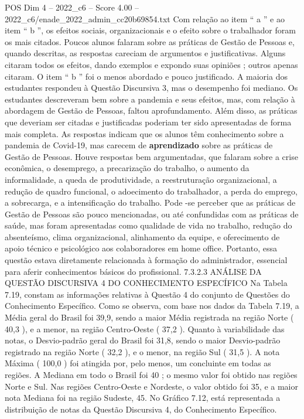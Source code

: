 \begin{textsample}{POS Dim 4 – 2022\_c6 – Score 4.00 – 2022\_c6/enade\_2022\_admin\_cc20b69854.txt}
Com relação ao item “ a ” e ao item “ b ”, os efeitos sociais, organizacionais e o efeito sobre o trabalhador foram os mais citados.
Poucos alunos falaram sobre as práticas de Gestão de Pessoas e, quando descritas, as respostas careciam de argumentos e justificativas.
Alguns citaram todos os efeitos, dando exemplos e expondo suas opiniões ; outros apenas citaram.
O item “ b ” foi o menos abordado e pouco justificado.
A maioria dos estudantes respondeu à Questão Discursiva 3, mas o desempenho foi mediano.
Os estudantes descreveram bem sobre a pandemia e seus efeitos, mas, com relação à abordagem de Gestão de Pessoas, faltou aprofundamento.
Além disso, as práticas que deveriam ser citadas e justificadas poderiam ter sido apresentadas de forma mais completa.
As respostas indicam que os alunos têm conhecimento sobre a pandemia de Covid-19, mas carecem de \textbf{aprendizado} sobre as práticas de Gestão de Pessoas.
Houve respostas bem argumentadas, que falaram sobre a crise econômica, o desemprego, a precarização do trabalho, o aumento da informalidade, a queda de produtividade, a reestruturação organizacional, a redução de quadro funcional, o adoecimento do trabalhador, a perda do emprego, a sobrecarga, e a intensificação do trabalho.
Pode -se perceber que as práticas de Gestão de Pessoas são pouco mencionadas, ou até confundidas com as práticas de saúde, mas foram apresentadas como qualidade de vida no trabalho, redução do absenteísmo, clima organizacional, alinhamento da equipe, e oferecimento de apoio técnico e psicológico aos colaboradores em home office.
Portanto, essa questão estava diretamente relacionada à formação do administrador, essencial para aferir conhecimentos básicos do profissional. 7.3.2.3 ANÁLISE DA QUESTÃO DISCURSIVA 4 DO CONHECIMENTO ESPECÍFICO Na Tabela 7.19, constam as informações relativas à Questão 4 do conjunto de Questões do Conhecimento Específico.
Como se observa, com base nos dados da Tabela 7.19, a Média geral do Brasil foi 39,9, sendo a maior Média registrada na região Norte ( 40,3 ), e a menor, na região Centro-Oeste ( 37,2 ).
Quanto à variabilidade das notas, o Desvio-padrão geral do Brasil foi 31,8, sendo o maior Desvio-padrão registrado na região Norte ( 32,2 ), e o menor, na região Sul ( 31,5 ).
A nota Máxima ( 100,0 ) foi atingida por, pelo menos, um concluinte em todas as regiões.
A Mediana em todo o Brasil foi 40 ; o mesmo valor foi obtido nas regiões Norte e Sul.
Nas regiões Centro-Oeste e Nordeste, o valor obtido foi 35, e a maior nota Mediana foi na região Sudeste, 45.
No Gráfico 7.12, está representada a distribuição de notas da Questão Discursiva 4, do Conhecimento Específico.

\end{textsample}
